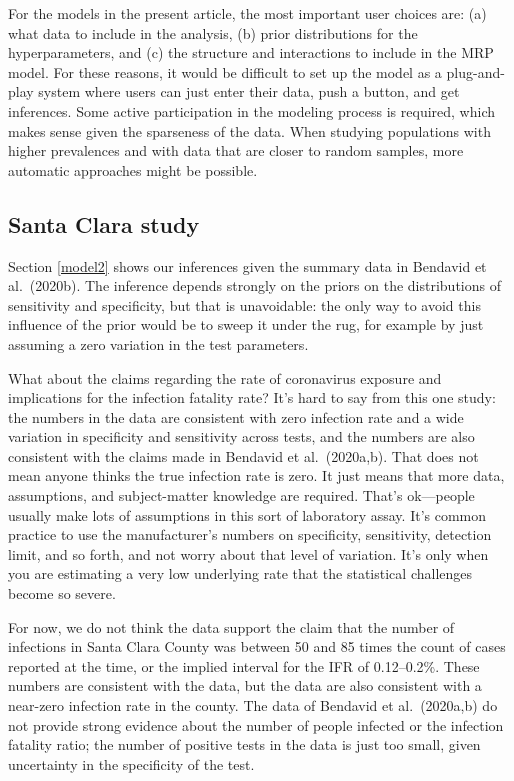 \documentclass[11pt]{article}
\begin{document}
For the models in the present article, the most important user choices are:  (a) what data to include in the analysis, (b) prior distributions for the hyperparameters, and (c) the structure and interactions to include in the MRP model.  For these reasons, it would be difficult to set up the model as a plug-and-play system where users can just enter their data, push a button, and get inferences.  Some active participation in the modeling process is required, which makes sense given the sparseness of the data.  When studying populations with higher prevalences and with data that are closer to random samples, more automatic approaches might be possible.

\subsection{Santa Clara study}

Section \ref{model2} shows our inferences given the summary data in Bendavid et al.\ (2020b).
The inference depends strongly on the priors on the distributions of sensitivity and specificity, but that is unavoidable:  the only way to avoid this influence of the prior would be to sweep it under the rug, for example by just assuming a zero variation in the test parameters.

What about the claims regarding the rate of coronavirus exposure and implications for the infection fatality rate?  It's hard to say from this one study:  the numbers in the data are consistent with zero infection rate and a wide variation in specificity and sensitivity across tests, and the numbers are also consistent with the claims made in Bendavid et al.\ (2020a,b). That does not mean anyone thinks the true infection rate is zero.  It just means that more data, assumptions, and subject-matter knowledge are required. That's ok---people usually make lots of assumptions in this sort of laboratory assay. It's common practice to use the manufacturer's numbers on specificity, sensitivity, detection limit, and so forth, and not worry about that level of variation. It's only when you are estimating a very low underlying rate that the statistical challenges become so severe.

For now, we do not think the data support the claim that the number of infections in Santa Clara County was between  50 and 85 times the count of cases reported at the time, or the implied interval for the IFR of 0.12--0.2\%.  These numbers are consistent with the data, but the data are also consistent with a near-zero infection rate in the county.  The data of Bendavid et al.\ (2020a,b) do not provide strong evidence about the number of people infected or the infection fatality ratio; the number of positive tests in the data is just too small, given uncertainty in the specificity of the test.
\end{document}
